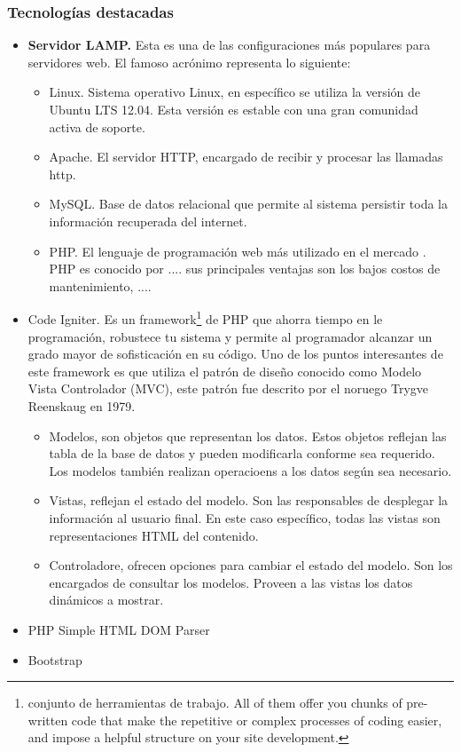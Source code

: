 \subsubsection{Tecnologías destacadas}

\begin{itemize}
	\item \textbf{Servidor LAMP.} Esta es una de las configuraciones más populares para servidores web. El famoso acrónimo representa lo siguiente:
	\begin{itemize}
		\item Linux. Sistema operativo Linux, en específico se utiliza la versión de Ubuntu LTS 12.04. Esta versión es estable con una gran comunidad activa de soporte.
		\item Apache. El servidor HTTP, encargado de recibir y procesar las llamadas http.
		\item MySQL. Base de datos relacional que permite al sistema persistir toda la información recuperada del internet.
		\item PHP. El lenguaje de programación web más utilizado en el mercado \cite{(REFERENCIA)}. PHP es conocido por ....
		sus principales ventajas son los bajos costos de mantenimiento, ....
	\end{itemize}
	
	\item Code Igniter. Es un framework\footnote{conjunto de herramientas de trabajo. All of them offer you chunks of pre-written code that make the repetitive or complex processes of coding easier, and impose a helpful structure on your site development.
} de PHP que ahorra tiempo en le programación, robustece tu sistema y permite al programador alcanzar un grado mayor de sofisticación en su código. Uno de los puntos interesantes de este framework es que utiliza el patrón de diseño conocido como Modelo Vista Controlador (MVC), este patrón fue descrito por el noruego Trygve Reenskaug en 1979. 
	\begin{itemize}
		\item Modelos, son objetos que representan los datos. Estos objetos reflejan las tabla de la base de datos y pueden modificarla conforme sea requerido. Los modelos también realizan operacioens a los datos según sea necesario.
		\item Vistas, reflejan el estado del modelo. Son las responsables de desplegar la información al usuario final. En este caso específico, todas las vistas son representaciones HTML del contenido.
		\item Controladore, ofrecen opciones para cambiar el estado del modelo. Son los encargados de consultar los modelos. Proveen a las vistas los datos dinámicos a mostrar.
	\end{itemize}
	\cite{upton2007codeigniter}
	\item PHP Simple HTML DOM Parser
	\cite{chen2009php} \cite{chowdhury2014intelwiki}
	\item Bootstrap \cite{otto2010bootstrap}
	\cite{cochran2012twitter}
	
\end{itemize}

